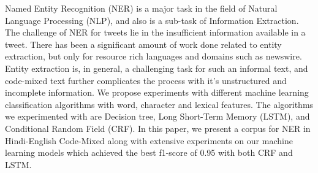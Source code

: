 Named Entity Recognition (NER) is a major task in the field of Natural Language Processing (NLP), and also is a sub-task of Information Extraction. The challenge of NER for tweets lie in the insufficient information available in a tweet. There has been a significant amount of work done related to entity extraction, but only for resource rich languages and domains such as newswire. Entity extraction is, in general, a challenging task for such an informal text, and code-mixed text further complicates the process with it's unstructured and incomplete information. We propose experiments with different machine learning classification algorithms with word, character and lexical features. The algorithms we experimented with are Decision tree, Long Short-Term Memory (LSTM), and Conditional Random Field (CRF). In this paper, we present a corpus for NER in Hindi-English Code-Mixed along with extensive experiments on our machine learning models which achieved the best f1-score of 0.95 with both CRF and LSTM.
